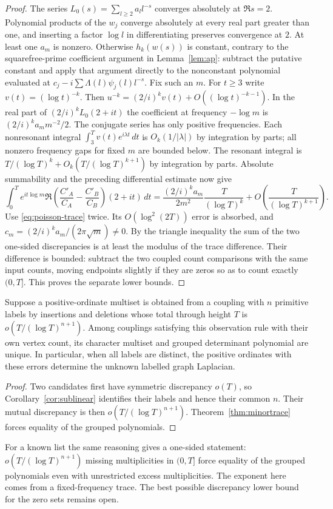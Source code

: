 \begin{proof}
The series $L_0(s)=\sum_{l\ge2} a_l l^{-s}$ converges absolutely at $\Re s=2$. Polynomial products of the $w_j$ converge absolutely at every real part greater than one, and inserting a factor $\log l$ in differentiating preserves convergence at $2$. At least one $a_m$ is nonzero. Otherwise $h_k(w(s))$ is constant, contrary to the squarefree-prime coefficient argument in Lemma~\ref{lem:ap}: subtract the putative constant and apply that argument directly to the nonconstant polynomial evaluated at $c_j-i\sum\Lambda(l)\psi_j(l)l^{-s}$. Fix such an $m$. For $t\ge3$ write $v(t)=(\log t)^{-k}$. Then $u^{-k}=(2/i)^k v(t)+O((\log t)^{-k-1})$. In the real part of $(2/i)^k L_0(2+it)$ the coefficient at frequency $-\log m$ is $(2/i)^k a_m m^{-2}/2$. The conjugate series has only positive frequencies. Each nonresonant integral $\int_3^T v(t)e^{i\lambda t}\,dt$ is $O_k(1/|\lambda|)$ by integration by parts; all nonzero frequency gaps for fixed $m$ are bounded below. The resonant integral is $T/(\log T)^k+O_k(T/(\log T)^{k+1})$ by integration by parts. Absolute summability and the preceding differential estimate now give
\[
 \int_0^T e^{it\log m}\Re\left(\frac{C'_A}{C_A}-\frac{C'_B}{C_B}\right)(2+it)\,dt
 =\frac{(2/i)^k a_m}{2m^2}\frac{T}{(\log T)^k}
   +O\!\left(\frac{T}{(\log T)^{k+1}}\right).
\]
Use \eqref{eq:poisson-trace} twice. Its $O(\log^2(2T))$ error is absorbed, and $c_m=(2/i)^k a_m/(2\pi\sqrt m)\ne0$. By the triangle inequality the sum of the two one-sided discrepancies is at least the modulus of the trace difference. Their difference is bounded: subtract the two coupled count comparisons with the same input counts, moving endpoints slightly if they are zeros so as to count exactly $(0,T]$. This proves the separate lower bounds.
\end{proof}

\begin{corollary}\label{cor:blind-positive}
Suppose a positive-ordinate multiset is obtained from a coupling with $n$ primitive labels by insertions and deletions whose total through height $T$ is $o(T/(\log T)^{n+1})$. Among couplings satisfying this observation rule with their own vertex count, its character multiset and grouped determinant polynomial are unique. In particular, when all labels are distinct, the positive ordinates with these errors determine the unknown labelled graph Laplacian.
\end{corollary}
\begin{proof}
Two candidates first have symmetric discrepancy $o(T)$, so Corollary~\ref{cor:sublinear} identifies their labels and hence their common $n$. Their mutual discrepancy is then $o(T/(\log T)^{n+1})$. Theorem~\ref{thm:minortrace} forces equality of the grouped polynomials.
\end{proof}
For a known list the same reasoning gives a one-sided statement: $o(T/(\log T)^{n+1})$ missing multiplicities in $(0,T]$ force equality of the grouped polynomials even with unrestricted excess multiplicities. The exponent here comes from a fixed-frequency trace. The best possible discrepancy lower bound for the zero sets remains open.


